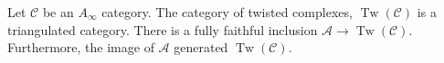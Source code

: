 

Let $\mathcal C$ be an $A_\infty$ category. The category of twisted complexes, $\operatorname{Tw}(\mathcal C)$ is a triangulated category. There is a fully faithful inclusion $\mathcal A\to \operatorname{Tw}(\mathcal C)$. Furthermore, the image of $\mathcal A$ generated $\operatorname{Tw}(\mathcal C)$.
